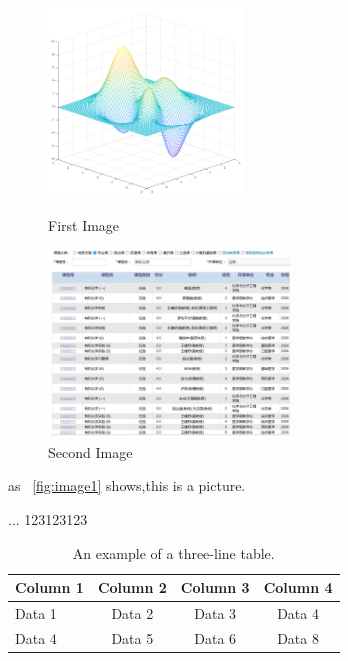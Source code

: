 \documentclass{HZNUMCM}
\begin{document}
  \begin{figure}[ht]
      \centering
      \begin{minipage}[b]{0.45\linewidth}
          \centering
          \includegraphics[height=5cm, keepaspectratio]{images/peaks.png} %
          \caption{First Image}
          \label{fig:image2}
      \end{minipage}
      \hspace{0.05\linewidth}
      \begin{minipage}[b]{0.45\linewidth}
          \centering
          \includegraphics[height=5cm, keepaspectratio]{images/courses.png} %
          \caption{Second Image}
          \label{fig:image3}
      \end{minipage}
  \end{figure}
  
  as \figurename~\ref{fig:image1} shows,this is a picture.

  ...\cite{example1}
  123123123\cite{rosenow1983drought}

  \begin{table}[h]
    \centering
    \caption{An example of a three-line table.}
    \begin{tabular}{lccc}
      \toprule
      \rowcolor{customcolor!50} %
      Column 1 & Column 2 & Column 3 & Column 4 \\
      \midrule
      Data 1 & Data 2 & Data 3 & Data 4 \\
      Data 4 & Data 5 & Data 6 & Data 8 \\
      \bottomrule
    \end{tabular}
    \label{tab:example}
  \end{table}

  
\end{document}
